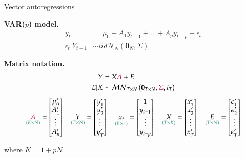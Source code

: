 \documentclass[notes,blackandwhite,mathsans,usenames,dvipsnames]{beamer}
\begin{document}
\begin{frame}{Vector autoregressions}

\textbf{VAR($p$) model.}
\begin{align*}
y_t &= \mu_0 + A_1 y_{t-1} + \dots + A_p y_{t-p} + \epsilon_t\\
\epsilon_t|Y_{t-1} &\sim iid\mathcal{N}_N\left(\mathbf{0}_N,\Sigma\right)
\end{align*}

\bigskip\textbf{Matrix notation.}
\begin{align*} 
Y &= X{\color{purple}A} + E\\
E|X &\sim\mathcal{MN}_{T\times N}\left(\mathbf{0}_{T\times N},{\color{purple}\Sigma}, I_T\right)
\end{align*} 
\footnotesize
$$ 
\underset{\color{mcxs2}(K\times N)}{{\color{purple}A}}=\begin{bmatrix} \mu_0'\\ A_1'\\ \vdots \\ A_p' \end{bmatrix} \quad
\underset{\color{mcxs2}(T\times N)}{Y}= \begin{bmatrix}y_1' \\ y_2'\\ \vdots \\ y_T'\end{bmatrix} \quad
\underset{\color{mcxs2}(K\times1)}{x_t}=\begin{bmatrix} 1\\ y_{t-1}\\ \vdots \\ y_{t-p} \end{bmatrix}\quad
\underset{\color{mcxs2}(T\times K)}{X}= \begin{bmatrix}x_1' \\ x_2' \\ \vdots \\ x_{T}'\end{bmatrix} \quad
\underset{\color{mcxs2}(T\times N)}{E}= \begin{bmatrix}\epsilon_1' \\ \epsilon_2' \\ \vdots \\ \epsilon_{T}'\end{bmatrix}
$$

{\color{mcxs2}where} $K=1+pN$

\end{frame}
\end{document}
